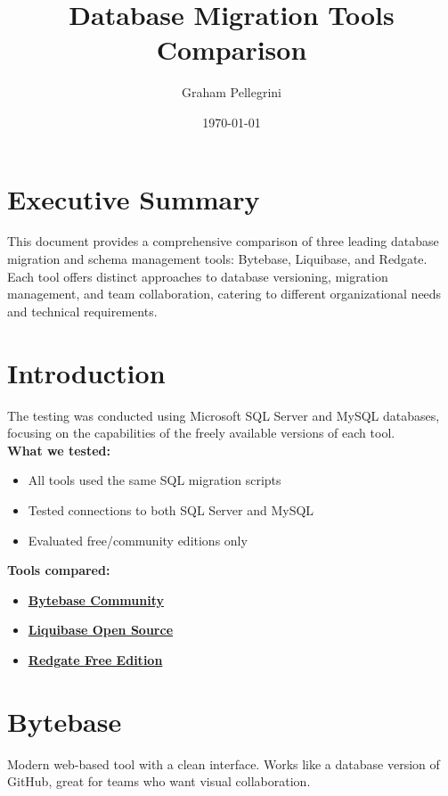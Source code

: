 \documentclass[11pt,a4paper]{article}
\title{Database Migration Tools Comparison}
\author{Graham Pellegrini}
\date{\today}
\begin{document}
\maketitle

\tableofcontents
\newpage

\section{Executive Summary}

This document provides a comprehensive comparison of three leading database migration and schema management tools: Bytebase, Liquibase, and Redgate.
Each tool offers distinct approaches to database versioning, migration management, and team collaboration, catering to different organizational needs and technical requirements.

\section{Introduction}
The testing was conducted using Microsoft SQL Server and MySQL databases, focusing on the  capabilities of the freely available versions of each tool.\\
\textbf{What we tested:}
\begin{itemize}
    \item All tools used the same SQL migration scripts
    \item Tested connections to both SQL Server and MySQL
    \item Evaluated free/community editions only
\end{itemize}

\textbf{Tools compared:}
\begin{itemize}
    \item \href{https://bytebase.com}{\textbf{Bytebase Community}}
    \item \href{https://liquibase.org}{\textbf{Liquibase Open Source}}
    \item \href{https://www.red-gate.com/products/sql-development/sql-compare/}{\textbf{Redgate Free Edition}}
\end{itemize}

\newpage

\section{Bytebase}

Modern web-based tool with a clean interface.
Works like a database version of GitHub, great for teams who want visual collaboration.
\end{document}

